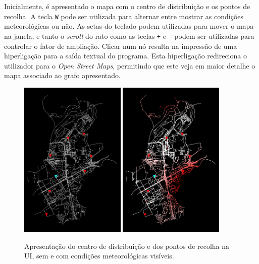 \documentclass[12pt, a4paper, titlepage]{article}
\begin{document}
Inicialmente, é apresentado o mapa com o centro de distribuição e os pontos de recolha. A tecla
\texttt{W} pode ser utilizada para alternar entre mostrar as condições meteorológicas ou não.
As setas do teclado podem utilizadas para mover o mapa na janela, e tanto o \emph{scroll} do rato
como as teclas \texttt{+} e \texttt{-} podem ser utilizadas para controlar o fator de ampliação.
Clicar num nó resulta na impressão de uma hiperligação para a saída textual do programa. Esta
hiperligação redireciona o utilizador para o \emph{Open Street Maps}, permitindo que este veja em
maior detalhe o mapa associado ao grafo apresentado.

\begin{figure}[H]
    \centering
    \includegraphics[width=0.45\textwidth]{res/PontosImportantes.png}
    \includegraphics[width=0.45\textwidth]{res/Tempo.png}
    \caption{
        Apresentação do centro de distribuição e dos pontos de recolha na UI, sem e com condições
        meteorológicas visíveis.
    }
\end{figure}
\end{document}
